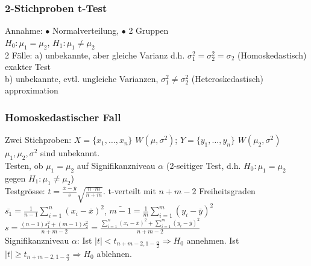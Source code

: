 \documentclass[a4paper,10pt]{article}
\newcommand{\Ra}{\Rightarrow}
\newcommand{\Abs}[1]{\left| #1 \right|} %
\newcommand{\Sumone}[2]{\sum_{#2=1}^{#1}} %
\newcommand{\Oneover}[1]{\frac{1}{#1}} %
\begin{document}
\subsubsection{2-Stichproben t-Test}
Annahme: $\bullet$ Normalverteilung, $\bullet$ 2 Gruppen\\
$H_0:\mu_1=\mu_2$, $H_1: \mu_1\neq\mu_2$\\
2 Fälle: a) unbekannte, aber gleiche Varianz d.h. $\sigma_1^2=\sigma_2^2=\sigma_2$ (Homoskedastisch) exakter Test\\
 b) unbekannte, evtl. ungleiche Varianzen, $\sigma_1^2\neq\sigma_2^2$ (Heteroskedastisch) approximation
\subsubsection{Homoskedastischer Fall}
Zwei Stichproben: $X=\{x_1,\dots,x_n\}$ $W(\mu,\sigma^2)$; $Y=\{y_1,\dots,y_n\}$ $W(\mu_2,\sigma^2)$\\
$\mu_1,\mu_2,\sigma^2$ sind unbekannt.\\
Testen, ob $\mu_1=\mu_2$ auf Signifikanzniveau $\alpha$ (2-seitiger Test, d.h. $H_0:\mu_1=\mu_2$ gegen $H_1:\mu_1\neq\mu_2$)\\
Testgrösse: $t=\frac{\bar{x}-\bar{y}}{s}\sqrt{\frac{n\cdot m}{n+m}}$. t-verteilt mit $n+m-2$ Freiheitsgraden\\ 
$\bar{s_1}=\Oneover{n-1}\Sumone{n}{i}(x_i-\bar{x})^2$, $\bar{m-1}=\Oneover{m}\Sumone{m}{i}(y_i-\bar{y})^2$\\
$s=\frac{(n-1)s_1^2+(m-1)s_2^2}{n+m-2}=\frac{\Sumone{n}{i}(x_i-\bar{x})^2+\Sumone{m}{i}(y_i-\bar{y})^2}{n+m-2}$\\
Signifikanzniveau $\alpha$: Ist $\Abs{t} < t_{n+m-2,1-\frac{\alpha}{2}}\Ra H_0$ annehmen. Ist $\Abs{t} \geq t_{n+m-2,1-\frac{\alpha}{2}}\Ra H_0$ ablehnen.
\end{document}
